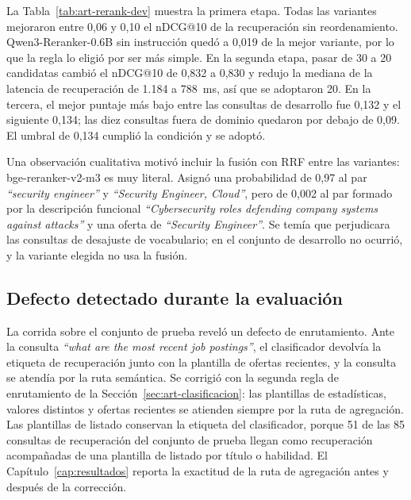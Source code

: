 La Tabla~\ref{tab:art-rerank-dev} muestra la primera etapa. Todas las variantes mejoraron entre 0,06 y 0,10 el nDCG@10 de la recuperación sin reordenamiento. Qwen3-Reranker-0.6B sin instrucción quedó a 0,019 de la mejor variante, por lo que la regla lo eligió por ser más simple. En la segunda etapa, pasar de 30 a 20 candidatas cambió el nDCG@10 de 0,832 a 0,830 y redujo la mediana de la latencia de recuperación de 1.184 a 788~ms, así que se adoptaron 20. En la tercera, el mejor puntaje más bajo entre las consultas de desarrollo fue 0,132 y el siguiente 0,134; las diez consultas fuera de dominio quedaron por debajo de 0,09. El umbral de 0,134 cumplió la condición y se adoptó.

Una observación cualitativa motivó incluir la fusión con RRF entre las variantes: bge-reranker-v2-m3 es muy literal. Asignó una probabilidad de 0,97 al par \textit{\enquote{security engineer}} y \textit{\enquote{Security Engineer, Cloud}}, pero de 0,002 al par formado por la descripción funcional \textit{\enquote{Cybersecurity roles defending company systems against attacks}} y una oferta de \textit{\enquote{Security Engineer}}. Se temía que perjudicara las consultas de desajuste de vocabulario; en el conjunto de desarrollo no ocurrió, y la variante elegida no usa la fusión.

\subsection{Defecto detectado durante la evaluación}

La corrida sobre el conjunto de prueba reveló un defecto de enrutamiento. Ante la consulta \textit{\enquote{what are the most recent job postings}}, el clasificador devolvía la etiqueta de recuperación junto con la plantilla de ofertas recientes, y la consulta se atendía por la ruta semántica. Se corrigió con la segunda regla de enrutamiento de la Sección~\ref{sec:art-clasificacion}: las plantillas de estadísticas, valores distintos y ofertas recientes se atienden siempre por la ruta de agregación. Las plantillas de listado conservan la etiqueta del clasificador, porque 51 de las 85 consultas de recuperación del conjunto de prueba llegan como recuperación acompañadas de una plantilla de listado por título o habilidad. El Capítulo~\ref{cap:resultados} reporta la exactitud de la ruta de agregación antes y después de la corrección.
